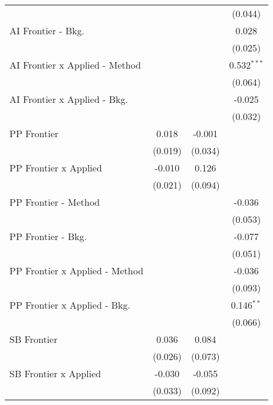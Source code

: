 \begin{tabular}{lccc}
                                  &         &               & (0.044)\\   
   AI Frontier - Bkg.             &         &               & 0.028\\   
                                  &         &               & (0.025)\\   
   AI Frontier x Applied - Method &         &               & 0.532$^{***}$\\   
                                  &         &               & (0.064)\\   
   AI Frontier x Applied - Bkg.   &         &               & -0.025\\   
                                  &         &               & (0.032)\\   
   PP Frontier                    & 0.018   & -0.001        &   \\   
                                  & (0.019) & (0.034)       &   \\   
   PP Frontier x Applied          & -0.010  & 0.126         &   \\   
                                  & (0.021) & (0.094)       &   \\   
   PP Frontier - Method           &         &               & -0.036\\   
                                  &         &               & (0.053)\\   
   PP Frontier - Bkg.             &         &               & -0.077\\   
                                  &         &               & (0.051)\\   
   PP Frontier x Applied - Method &         &               & -0.036\\   
                                  &         &               & (0.093)\\   
   PP Frontier x Applied - Bkg.   &         &               & 0.146$^{**}$\\   
                                  &         &               & (0.066)\\   
   SB Frontier                    & 0.036   & 0.084         &   \\   
                                  & (0.026) & (0.073)       &   \\   
   SB Frontier x Applied          & -0.030  & -0.055        &   \\   
                                  & (0.033) & (0.092)       &   \\   

\end{tabular}
